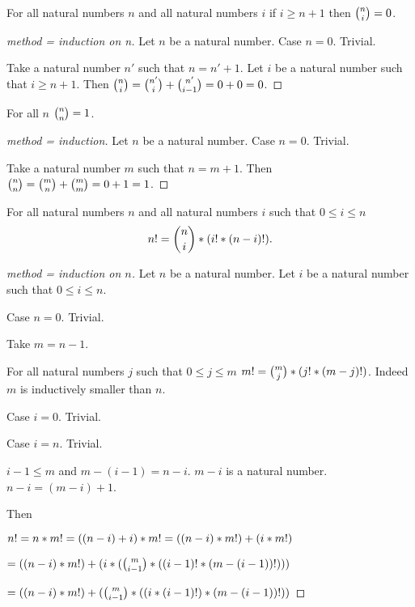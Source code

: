 \documentclass[english,11pt]{article}
\begin{document}
\begin{forthel}
\begin{theorem} For all natural numbers $n$ and 
all natural numbers $i$
if $i \geq n + 1$ then ${n \choose i} = 0$.
\end{theorem}
\begin{proof}[method = induction on n]
Let $n$ be a natural number.
Case $n = 0$. Trivial.

Take a natural number $n'$ such that $n = n' + 1$.
Let $i$ be a natural number such that $i \geq n + 1$.
Then ${n \choose i} = {n' \choose i} + {n' \choose i-1} = 0 + 0 = 0$.
\end{proof}


\begin{theorem} For all $n$
${n \choose n} = 1$.
\end{theorem}
\begin{proof}[method = induction]
Let $n$ be a natural number.
Case $n = 0$. Trivial.

Take a natural number $m$ such that $n = m + 1$.
Then ${n \choose n} = {m \choose n} + {m \choose m} = 0 + 1 = 1$.

\end{proof}

\begin{lemma} For all natural numbers $n$ and all natural numbers $i$ 
such that  $0 \leq i \leq n$
\[n ! = {n \choose i} * (i ! * (n-i) !).\]
\end{lemma}

\begin{proof}[method = induction on $n$]
Let $n$ be a natural number.
Let $i$ be a natural number such that $0 \leq i \leq n$.

Case $n = 0$. Trivial.

Take $m = n - 1$.  

For all natural numbers $j$ such that $0 \leq j \leq m$ $m ! = 
{m \choose j} * (j ! * (m-j) !)$.
Indeed $m$ is inductively smaller than $n$.

Case $i = 0$. Trivial.

Case $i = n$. Trivial.

$i - 1 \leq m$ and $m - (i-1) = n - i$. $m - i$ is a natural number. 
$n - i = (m - i) + 1$.

Then

$n ! = n * m ! = ((n-i) + i) * m ! = ((n-i) * m !) + (i * m !)$

$= ((n-i) * m !) + (i * ({m \choose i-1} * ((i-1) ! * (m - (i-1)) !)))$

$= ((n-i) * m !) + ({m \choose i-1} * ((i * (i-1) !) * (m - (i-1)) !))$


\end{proof}
\end{forthel}
\end{document}
